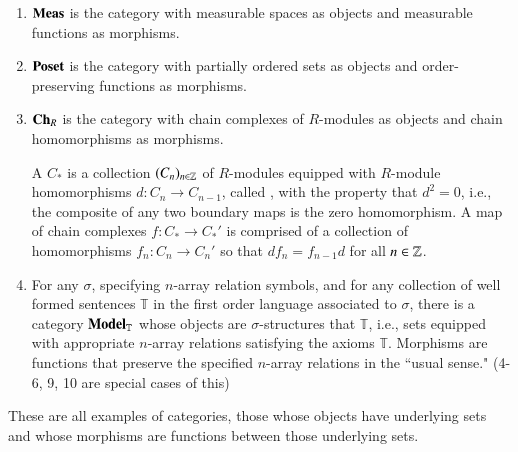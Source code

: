 \begin{example}
\begin{enumerate}
        \item $\normalfont\textbf{Meas}$ is the category with measurable spaces as objects and measurable functions as morphisms. 
        \item $\normalfont\textbf{Poset}$ is the category with partially ordered sets as objects and order-preserving functions as morphisms.
        \item $\normalfont\textbf{Ch}_R$ is the category with chain complexes of $R$-modules as objects and chain homomorphisms as morphisms.
            \begin{definition}
                A  $C_*$ is a collection $(C_n)_{n \in \mathbb Z}$ of $R$-modules equipped with $R$-module homomorphisms $d:C_n\rightarrow C_{n-1}$, called , with the property that $d^2 = 0$, i.e., the composite of any two boundary maps is the zero homomorphism. A map of chain complexes $f:C_* \rightarrow C_*'$ is comprised of a collection of homomorphisms $f_n:C_n\rightarrow C_n'$ so that $df_n = f_{n-1}d$ for all $n \in \mathbb Z$.
            \end{definition}
        \item For any  $\sigma$, specifying $n$-array relation symbols, and for any collection of well formed sentences $\mathbb{T}$ in the first order language associated to $\sigma$, there is a category $\normalfont\textbf{Model}_{\mathbb{T}}$ whose objects are $\sigma$-structures that  $\mathbb{T}$, i.e., sets equipped with appropriate $n$-array relations satisfying the axioms $\mathbb{T}$. Morphisms are functions that preserve the specified $n$-array relations in the ``usual sense." (4-6, 9, 10 are special cases of this)
    \end{enumerate}
\end{example}

These are all examples of  categories, those whose objects have underlying sets and whose morphisms are functions between those underlying sets.

